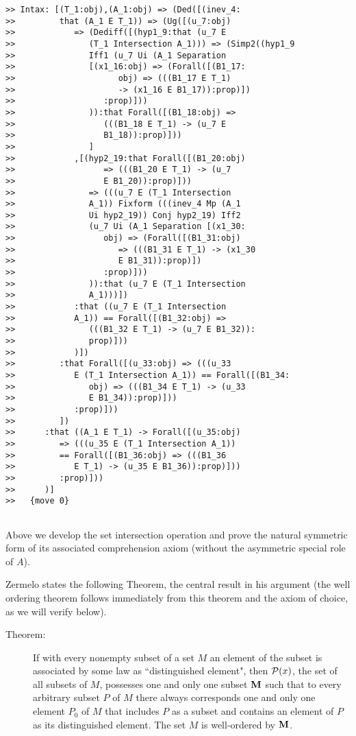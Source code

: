 \documentclass[12pt]{article}
\begin{document}
\begin{verbatim}
>> Intax: [(T_1:obj),(A_1:obj) => (Ded([(inev_4:
>>         that (A_1 E T_1)) => (Ug([(u_7:obj)
>>            => (Dediff([(hyp1_9:that (u_7 E
>>               (T_1 Intersection A_1))) => (Simp2((hyp1_9
>>               Iff1 (u_7 Ui (A_1 Separation
>>               [(x1_16:obj) => (Forall([(B1_17:
>>                     obj) => (((B1_17 E T_1)
>>                     -> (x1_16 E B1_17)):prop)])
>>                  :prop)]))
>>               )):that Forall([(B1_18:obj) =>
>>                  (((B1_18 E T_1) -> (u_7 E
>>                  B1_18)):prop)]))
>>               ]
>>            ,[(hyp2_19:that Forall([(B1_20:obj)
>>                  => (((B1_20 E T_1) -> (u_7
>>                  E B1_20)):prop)]))
>>               => (((u_7 E (T_1 Intersection
>>               A_1)) Fixform (((inev_4 Mp (A_1
>>               Ui hyp2_19)) Conj hyp2_19) Iff2
>>               (u_7 Ui (A_1 Separation [(x1_30:
>>                  obj) => (Forall([(B1_31:obj)
>>                     => (((B1_31 E T_1) -> (x1_30
>>                     E B1_31)):prop)])
>>                  :prop)]))
>>               )):that (u_7 E (T_1 Intersection
>>               A_1)))])
>>            :that ((u_7 E (T_1 Intersection
>>            A_1)) == Forall([(B1_32:obj) =>
>>               (((B1_32 E T_1) -> (u_7 E B1_32)):
>>               prop)]))
>>            )])
>>         :that Forall([(u_33:obj) => (((u_33
>>            E (T_1 Intersection A_1)) == Forall([(B1_34:
>>               obj) => (((B1_34 E T_1) -> (u_33
>>               E B1_34)):prop)]))
>>            :prop)]))
>>         ])
>>      :that ((A_1 E T_1) -> Forall([(u_35:obj)
>>         => (((u_35 E (T_1 Intersection A_1))
>>         == Forall([(B1_36:obj) => (((B1_36
>>            E T_1) -> (u_35 E B1_36)):prop)]))
>>         :prop)]))
>>      )]
>>   {move 0}


\end{verbatim}

Above we develop the set intersection operation and prove the natural symmetric form of its associated comprehension axiom (without the asymmetric special role of $A$).

Zermelo states the following Theorem, the central result in his argument (the well ordering theorem follows immediately from this theorem and the axiom of choice, as we will verify below).

\begin{description}

\item[Theorem:]  If with every nonempty subset of a set $M$ an element of the subset is associated by some law as ``distinguished element", then ${\cal P}(x)$, the set of all subsets of $M$, possesses one and only one subset ${\bf M}$ such that to every arbitrary subset $P$ of $M$  there always corresponds one and only one element $P_0$ of $M$ that includes $P$ as a subset and contains an element of $P$ as its distinguished element.  The set $M$ is well-ordered by ${\bf M}$.

\end{description}
\end{document}
